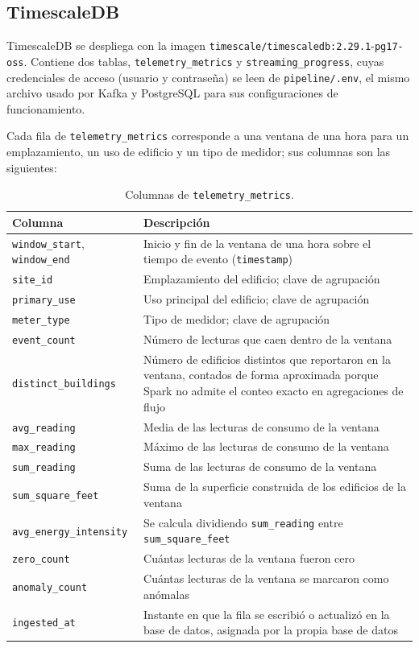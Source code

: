 \subsection{TimescaleDB}

TimescaleDB se despliega con la imagen \texttt{timescale/timescaledb:2.29.1}-\texttt{pg17-oss}. Contiene dos tablas, \texttt{telemetry\_metrics} y \texttt{streaming\_progress}, cuyas credenciales de acceso (usuario y contraseña) se leen de \texttt{pipeline/.env}, el mismo archivo usado por Kafka y PostgreSQL para sus configuraciones de funcionamiento.

Cada fila de \texttt{telemetry\_metrics} corresponde a una ventana de una hora para un emplazamiento, un uso de edificio y un tipo de medidor; sus columnas son las siguientes:

\begin{table}[H]
  \centering
  \begin{tabular}{|l|p{9cm}|}
    \hline
    \textbf{Columna} & \textbf{Descripción} \\ \hline
    \texttt{window\_start}, \texttt{window\_end} & Inicio y fin de la ventana de una hora sobre el tiempo de evento (\texttt{timestamp}) \\ \hline
    \texttt{site\_id} & Emplazamiento del edificio; clave de agrupación \\ \hline
    \texttt{primary\_use} & Uso principal del edificio; clave de agrupación \\ \hline
    \texttt{meter\_type} & Tipo de medidor; clave de agrupación \\ \hline
    \texttt{event\_count} & Número de lecturas que caen dentro de la ventana \\ \hline
    \texttt{distinct\_buildings} & Número de edificios distintos que reportaron en la ventana, contados de forma aproximada porque Spark no admite el conteo exacto en agregaciones de flujo \\ \hline
    \texttt{avg\_reading} & Media de las lecturas de consumo de la ventana \\ \hline
    \texttt{max\_reading} & Máximo de las lecturas de consumo de la ventana \\ \hline
    \texttt{sum\_reading} & Suma de las lecturas de consumo de la ventana \\ \hline
    \texttt{sum\_square\_feet} & Suma de la superficie construida de los edificios de la ventana \\ \hline
    \texttt{avg\_energy\_intensity} & Se calcula dividiendo \texttt{sum\_reading} entre \texttt{sum\_square\_feet} \\ \hline
    \texttt{zero\_count} & Cuántas lecturas de la ventana fueron cero \\ \hline
    \texttt{anomaly\_count} & Cuántas lecturas de la ventana se marcaron como anómalas \\ \hline
    \texttt{ingested\_at} & Instante en que la fila se escribió o actualizó en la base de datos, asignada por la propia base de datos \\ \hline
  \end{tabular}
  \caption{Columnas de \texttt{telemetry\_metrics}.}
  \label{tab:columnas-telemetry-metrics}
\end{table}

